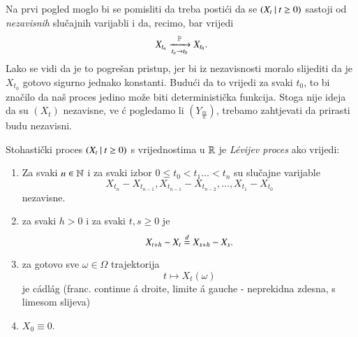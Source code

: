 \begin{nap} \label{nap:21.2}
    Na prvi pogled moglo bi se pomisliti da treba posti\' ci da se $({X_t} \: | \: {t \geq 0})$ sastoji od \emph{nezavisnih} slu\v cajnih varijabli i da, recimo, bar vrijedi
    \begin{equation*}
        X_{t_n} \xrightarrow[t_n \to t_0]{\mathbb{P}} X_{t_0}.
    \end{equation*}
    Lako se vidi da je to pogre\v san pristup, jer bi iz nezavisnosti moralo slijediti da je $X_{t_0}$ gotovo sigurno jednako konstanti.
    Budu\' ci da to vrijedi za svaki $t_0$, to bi zna\v cilo da na\v s proces jedino mo\v ze biti deterministi\v cka funkcija.
    Stoga nije ideja da su $(X_t)$ nezavisne, ve \' c pogledamo li $(Y_{\frac{m}{n}})$, trebamo zahtjevati da prirasti budu nezavisni.
\end{nap}

\begin{defn}    \label{defn:21.3}
    Stohasti\v cki proces $({X_t} \: | \: {t \geq 0})$ s vrijednostima u $\mathbb{R}$ je \emph{L\' evijev proces} ako vrijedi:
    \begin{enumerate}[label=(\alph*)]
        \item   \label{defn:21.3.1}
        Za svaki $n \in \mathbb{N}$ i za svaki izbor $0 \leq t_0 < t_1 \ldots < t_n$ su slu\v cajne varijable
        \begin{equation*}
            X_{t_n} - X_{t_{n - 1}}, X_{t_{n - 1}} - X_{t_{n - 2}}, \ldots, X_{t_1} - X_{t_0}
        \end{equation*}
        nezavisne.
        \item   \label{defn:21.3.2}
        za svaki $h > 0$ i za svaki $t, s \geq 0$ je
        \begin{equation*}
            X_{t + h} - X_t \overset{d}{=} X_{s + h} - X_s.
        \end{equation*}
        \item   \label{defn:21.3.3}
        za gotovo sve $\omega \in \Omega$ trajektorija
        \begin{equation*}
            t \mapsto X_t (\omega)
        \end{equation*}
        je c\' adl\' ag (franc. continue \' a droite, limite \' a gauche - neprekidna zdesna, s limesom slijeva)
        \item   \label{defn:21.3.4}
        $X_0 \equiv 0$.
    \end{enumerate}
\end{defn}

